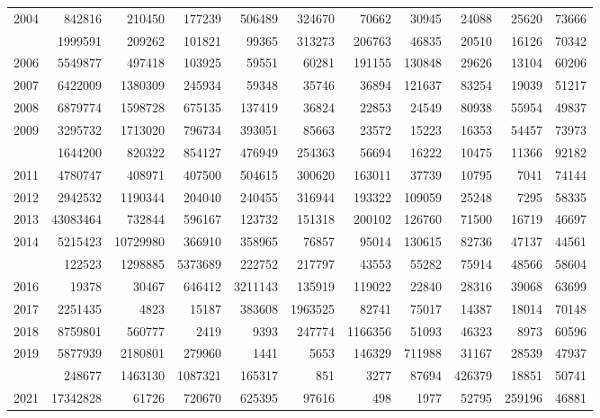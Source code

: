 \documentclass[
]{article}
\begin{document}
\begin{longtable}[t]{lrrrrrrrrrr}
2004 & 842816 & 210450 & 177239 & 506489 & 324670 & 70662 & 30945 & 24088 & 25620 & 73666\\
\addlinespace
2005 & 1999591 & 209262 & 101821 & 99365 & 313273 & 206763 & 46835 & 20510 & 16126 & 70342\\
2006 & 5549877 & 497418 & 103925 & 59551 & 60281 & 191155 & 130848 & 29626 & 13104 & 60206\\
2007 & 6422009 & 1380309 & 245934 & 59348 & 35746 & 36894 & 121637 & 83254 & 19039 & 51217\\
2008 & 6879774 & 1598728 & 675135 & 137419 & 36824 & 22853 & 24549 & 80938 & 55954 & 49837\\
2009 & 3295732 & 1713020 & 796734 & 393051 & 85663 & 23572 & 15223 & 16353 & 54457 & 73973\\
\addlinespace
2010 & 1644200 & 820322 & 854127 & 476949 & 254363 & 56694 & 16222 & 10475 & 11366 & 92182\\
2011 & 4780747 & 408971 & 407500 & 504615 & 300620 & 163011 & 37739 & 10795 & 7041 & 74144\\
2012 & 2942532 & 1190344 & 204040 & 240455 & 316944 & 193322 & 109059 & 25248 & 7295 & 58335\\
2013 & 43083464 & 732844 & 596167 & 123732 & 151318 & 200102 & 126760 & 71500 & 16719 & 46697\\
2014 & 5215423 & 10729980 & 366910 & 358965 & 76857 & 95014 & 130615 & 82736 & 47137 & 44561\\
\addlinespace
2015 & 122523 & 1298885 & 5373689 & 222752 & 217797 & 43553 & 55282 & 75914 & 48566 & 58604\\
2016 & 19378 & 30467 & 646412 & 3211143 & 135919 & 119022 & 22840 & 28316 & 39068 & 63699\\
2017 & 2251435 & 4823 & 15187 & 383608 & 1963525 & 82741 & 75017 & 14387 & 18014 & 70148\\
2018 & 8759801 & 560777 & 2419 & 9393 & 247774 & 1166356 & 51093 & 46323 & 8973 & 60596\\
2019 & 5877939 & 2180801 & 279960 & 1441 & 5653 & 146329 & 711988 & 31167 & 28539 & 47937\\
\addlinespace
2020 & 248677 & 1463130 & 1087321 & 165317 & 851 & 3277 & 87694 & 426379 & 18851 & 50741\\
2021 & 17342828 & 61726 & 720670 & 625395 & 97616 & 498 & 1977 & 52795 & 259196 & 46881\\*
\end{longtable}
\end{document}
